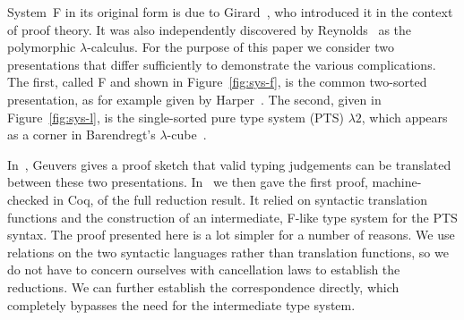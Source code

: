 \documentclass[a4paper,UKenglish]{lipics-v2016}
\newcommand{\SysL}{$\lambda2$\xspace}
\theoremstyle{plain}
\begin{document}

System~F in its original form is due to Girard~\cite{Girard1972, Girard1989}, who introduced it in the context of proof theory.
It was also independently discovered by Reynolds~\cite{DBLP:conf/programm/Reynolds74} as the polymorphic $\lambda$-calculus.
For the purpose of this paper we consider two presentations that differ sufficiently to demonstrate the various complications.
The first, called F and shown in Figure~\ref{fig:sys-f}, is the common two-sorted presentation, as for example given by Harper~\cite{Harper2013}.
The second, given in Figure~\ref{fig:sys-l}, is the single-sorted pure type system (PTS) \SysL, which appears as a corner in Barendregt's $\lambda$-cube~\cite{DBLP:journals/jfp/Barendregt91}.

In~\cite{Geuvers1993}, Geuvers gives a proof sketch that valid typing judgements can be translated between these two presentations.
In~\cite{KaiserEtAl:2017:sysf_pts_equiv_coq} we then gave the first proof, machine-checked in Coq, of the full reduction result.
It relied on syntactic translation functions and the construction of an intermediate, F-like type system for the PTS syntax.
The proof presented here is a lot simpler for a number of reasons.
We use relations on the two syntactic languages rather than translation functions, so we do not have to concern ourselves with cancellation laws to establish the reductions.
We can further establish the correspondence directly, which completely bypasses the need for the intermediate type system.
\end{document}
